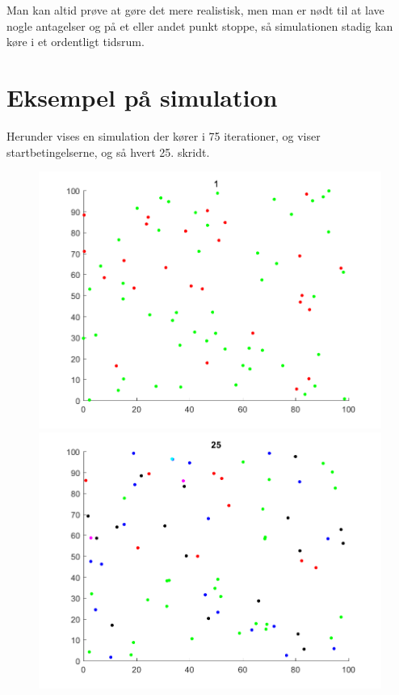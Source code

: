 \documentclass[a4paper,10pt]{article} 	%
\numberwithin{equation}{section}
\begin{document}
	Man kan altid prøve at gøre det mere realistisk, men man er nødt til at lave nogle antagelser og på et eller andet punkt stoppe, så simulationen stadig kan køre i et ordentligt tidsrum.
	
	
	\section{Eksempel på simulation}
	Herunder vises en simulation der kører i 75 iterationer, og viser startbetingelserne, og så hvert 25. skridt.
	\begin{figure}[H]
		\centering
		\begin{minipage}{0.45\textwidth}
			\centering
			\includegraphics[width=\textwidth]{img/plot1.png}
		\end{minipage}
		\begin{minipage}{0.45\textwidth}
			\centering
			\includegraphics[width=\textwidth]{img/plot2.png}

\end{minipage}
\end{figure}
\end{document}
